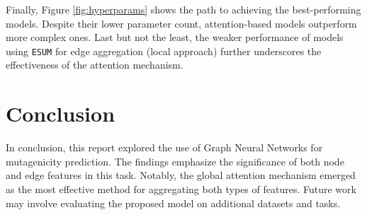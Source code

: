 \documentclass[10pt,twocolumn]{article}
\begin{document}
Finally, Figure \ref{fig:hyperparams} shows the path to achieving the best-performing models. 
Despite their lower parameter count, attention-based models outperform more complex ones. 
Last but not the least, the weaker performance of models using \texttt{ESUM} for edge aggregation (local approach) 
further underscores the effectiveness of the attention mechanism.

\section{Conclusion}
In conclusion, this report explored the use of Graph Neural Networks for mutagenicity prediction. 
The findings emphasize the significance of both node and edge features in this task. 
Notably, the global attention mechanism emerged as the most effective method for aggregating both types of features. 
Future work may involve evaluating the proposed model on additional datasets and tasks.

\newpage


\end{document}
